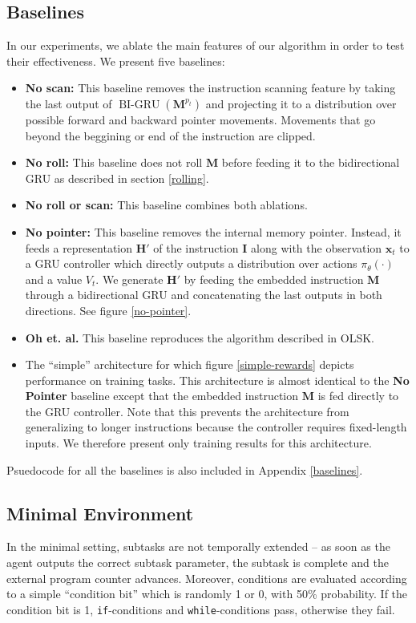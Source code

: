 \documentclass{article}
\DeclareMathOperator{\BIGRU}{BI-GRU}
\begin{document}
\subsection{Baselines}
In our experiments, we ablate the main features of our algorithm in order to
test their effectiveness. We present five baselines:
\begin{itemize}
  \item \textbf{No scan:} This baseline removes the instruction scanning feature by
    taking the last output of $\BIGRU(\mathbf{M}^{p_t})$ and projecting it to
    a distribution over possible forward and backward pointer movements.
    Movements that go beyond the beggining or end of the instruction are clipped.
  \item \textbf{No roll:} This baseline does not roll $\mathbf{M}$ before feeding
    it to the bidirectional GRU as described in section \ref{rolling}.
  \item \textbf{No roll or scan:} This baseline combines both ablations.
  \item \textbf{No pointer:} This baseline removes the internal memory pointer.
    Instead, it feeds a representation $\mathbf{H}'$ of the instruction
    $\mathbf{I}$ along with the observation $\mathbf{x}_t$ to a GRU controller
    which directly outputs a distribution over actions $\pi_\theta(\cdot)$ and a
    value $V_t$. We generate $\mathbf{H}'$ by feeding the embedded instruction
    $\mathbf{M}$ through a bidirectional GRU and concatenating the last outputs
    in both directions. See figure \ref{no-pointer}. 
  \item \textbf{Oh et. al.} This baseline reproduces the algorithm described in
    OLSK.
  \item The ``simple'' architecture for which figure
    \ref{simple-rewards} depicts performance on training tasks. This
    architecture is almost identical to the \textbf{No Pointer} baseline except
    that the embedded instruction $\mathbf{M}$ is fed directly to the GRU
    controller. Note that this prevents the architecture from generalizing to
    longer instructions because the controller requires fixed-length inputs. We
    therefore present only training results for this architecture.
\end{itemize}
Psuedocode for all the baselines is also included in Appendix \ref{baselines}.

\subsection{Minimal Environment}
In the minimal setting, subtasks are not
temporally extended -- as soon as the agent outputs the correct subtask
parameter, the subtask is complete and the external program counter advances.
Moreover, conditions are evaluated according to a simple ``condition bit'' which
is randomly 1 or 0, with 50\% probability. If the condition bit is 1,
\texttt{if}-conditions and \texttt{while}-conditions pass, otherwise they fail.
\end{document}
